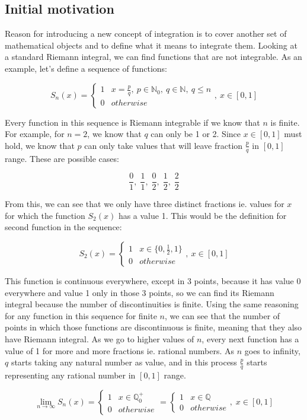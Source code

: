 \documentclass{article}
\begin{document}
\subsection{Initial motivation}
Reason for introducing a new concept of integration is to cover another set of mathematical objects and to define what it means to integrate them. Looking at a standard Riemann integral, we can find functions that are not integrable. As an example, let's define a sequence of functions:

\[ S_n(x) = \begin{cases}
    1 & x = \frac{p}{q},\: p \in \mathbb{N}_0,\: q \in \mathbb{N},\: q \leq n \\
    0 & otherwise
\end{cases},\: x \in [0, 1] \]

Every function in this sequence is Riemann integrable if we know that $n$ is finite. For example, for $n=2$, we know that $q$ can only be 1 or 2. Since $x \in [0, 1]$ must hold, we know that $p$ can only take values that will leave fraction $\frac{p}{q}$ in $[0, 1]$ range. These are possible cases:

\[\frac{0}{1},\;\frac{1}{1},\;\frac{0}{2},\;\frac{1}{2},\;\frac{2}{2}\]

From this, we can see that we only have three distinct fractions ie. values for $x$ for which the function $S_2(x)$ has a value 1. This would be the definition for second function in the sequence:

\[S_2(x) = \begin{cases}
    1 & x \in \{0,\frac{1}{2},1\} \\
    0 & otherwise
\end{cases},\: x \in [0, 1] \]

This function is continuous everywhere, except in 3 points, because it has value 0 everywhere and value 1 only in those 3 points, so we can find its Riemann integral because the number of discontinuities is finite. Using the same reasoning for any function in this sequence for finite $n$, we can see that the number of points in which those functions are discontinuous is finite, meaning that they also have Riemann integral. As we go to higher values of $n$, every next function has a value of 1 for more and more fractions ie. rational numbers. As $n$ goes to infinity, $q$ starts taking any natural number as value, and in this process $\frac{p}{q}$ starts representing any rational number in $[0, 1]$ range.

\[ \lim_{n\to\infty}S_n(x) = \begin{cases}
    1 & x \in \mathbb{Q}_{0}^{+} \\
    0 & otherwise
\end{cases} = \begin{cases}
    1 & x \in \mathbb{Q} \\
    0 & otherwise
\end{cases},\; x \in [0, 1] \]
\end{document}
